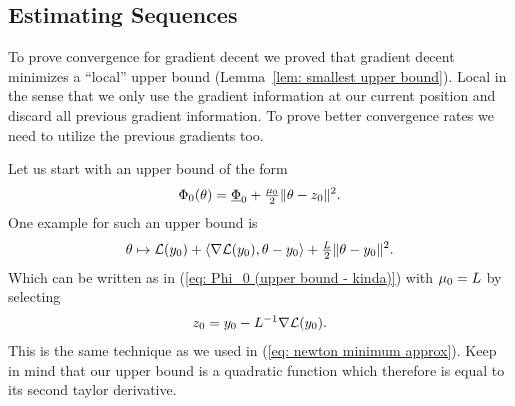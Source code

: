 \subsection{Estimating Sequences}

To prove convergence for gradient decent we proved that gradient decent
minimizes a ``local'' upper bound (Lemma~\ref{lem: smallest upper bound}). Local
in the sense that we only use the gradient information at our current position
and discard all previous gradient information. To prove better convergence rates
we need to utilize the previous gradients too.

Let us start with an upper bound of the form
%
\begin{align}\label{eq: Phi_0 (upper bound - kinda)}
	\Phi_0(\theta) = \underline{\Phi}_0 + \tfrac{\mu_0}{2}\|\theta-z_0\|^2.
\end{align}
%
One example for such an upper bound is
%
\begin{align*}
	\theta \mapsto
	\mathcal{L}(y_0)
	+ \langle\nabla\mathcal{L}(y_0), \theta - y_0\rangle
	+ \tfrac{L}{2}\|\theta -y_0\|^2.
\end{align*}
%
Which can be written as in (\ref{eq: Phi_0 (upper bound - kinda)}) with
\(\mu_0=L\) by selecting
%
\begin{align*}
	z_0 = y_0 - L^{-1}\nabla\mathcal{L}(y_0).
\end{align*}
This is the same technique as we used in (\ref{eq: newton minimum approx}). Keep
in mind that our upper bound is a quadratic function which therefore
is equal to its second taylor derivative.


